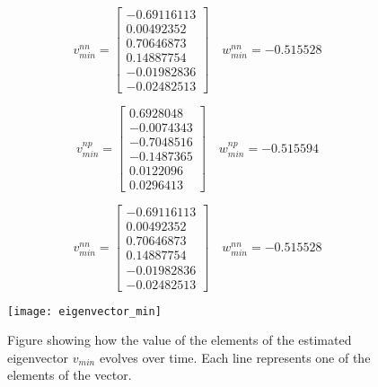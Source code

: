  \begin{equation*}
	 v_{min}^{nn} = \begin{bmatrix}
	  -0.69116113  \\
	  0.00492352  \\
	  0.70646873  \\
	  0.14887754 \\
	  -0.01982836 \\
	  -0.02482513
	 \end{bmatrix} \quad w_{min}^{nn} = -0.515528
 \end{equation*}


\begin{equation*}
  v_{min}^{np} = \begin{bmatrix}
   0.6928048 \\
  -0.0074343 \\
  -0.7048516 \\
  -0.1487365 \\
  0.0122096 \\
  0.0296413
  \end{bmatrix} \quad w_{min}^{np} = -0.515594
\end{equation*}

\begin{equation*}
  v_{min}^{nn} = \begin{bmatrix}
   -0.69116113  \\
   0.00492352  \\
   0.70646873  \\
   0.14887754 \\
   -0.01982836 \\
   -0.02482513
  \end{bmatrix} \quad w_{min}^{nn} = -0.515528
\end{equation*}

\begin{figure}[htbp]
 \centering
 \texttt{[image: eigenvector\_min]}
 \caption{Figure showing how the value of the elements of the estimated eigenvector $v_{min}$ evolves over time. Each line represents one of the elements of the vector.}
 \label{fig:eigenvector_min}
\end{figure}

